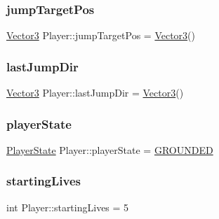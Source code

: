 \subsubsection{\texorpdfstring{jump\+Target\+Pos}{jumpTargetPos}}
{\footnotesize\ttfamily \hyperlink{class_vector3}{Vector3} Player\+::jump\+Target\+Pos = \hyperlink{class_vector3}{Vector3}()\hspace{0.3cm}{\ttfamily [protected]}}

\mbox{\label{class_player_afef6386ca5fe8974bcc3d807b2261a09}} 
\subsubsection{\texorpdfstring{last\+Jump\+Dir}{lastJumpDir}}
{\footnotesize\ttfamily \hyperlink{class_vector3}{Vector3} Player\+::last\+Jump\+Dir = \hyperlink{class_vector3}{Vector3}()}

\mbox{\label{class_player_aea87fbb086b0cc358db8adf47bfa7369}} 
\subsubsection{\texorpdfstring{player\+State}{playerState}}
{\footnotesize\ttfamily \hyperlink{_player_8h_a3c730f37b1b3a893159bada67637fdb1}{Player\+State} Player\+::player\+State = \hyperlink{_player_8h_a3c730f37b1b3a893159bada67637fdb1aefa0f3ce09b7d810dde1e3cde60f7c4f}{G\+R\+O\+U\+N\+D\+ED}}

\mbox{\label{class_player_a11d9ba38b586f5acfac4f2cd5233cbb4}} 
\subsubsection{\texorpdfstring{starting\+Lives}{startingLives}}
{\footnotesize\ttfamily int Player\+::starting\+Lives = 5}

\mbox{\label{class_player_ab85f1fa829960281bfdf1171ecdbead7}} 
